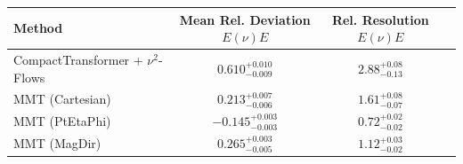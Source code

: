    \begin{tabular}{lccc}
        \toprule
        Method & Mean Rel. Deviation $E(\nu)E$ & Rel. Resolution $E(\nu)E$ \\
        \midrule
        CompactTransformer + $\nu^2$-Flows & $0.610^{+0.010}_{-0.009}$ & $2.88^{+0.08}_{-0.13}$ \\
        MMT (Cartesian) & $0.213^{+0.007}_{-0.006}$ & $1.61^{+0.08}_{-0.07}$ \\
        MMT (PtEtaPhi) & $-0.145^{+0.003}_{-0.003}$ & $0.72^{+0.02}_{-0.02}$ \\
        MMT (MagDir) & $0.265^{+0.003}_{-0.005}$ & $1.12^{+0.03}_{-0.02}$ \\
        \bottomrule
    \end{tabular}
